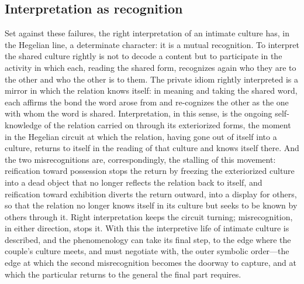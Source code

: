 \subsection*{Interpretation as recognition}

Set against these failures, the right interpretation of an intimate culture has, in the Hegelian line, a determinate character: it is a mutual recognition. To interpret the shared culture rightly is not to decode a content but to participate in the activity in which each, reading the shared form, recognizes again who they are to the other and who the other is to them. The private idiom rightly interpreted is a mirror in which the relation knows itself: in meaning and taking the shared word, each affirms the bond the word arose from and re-cognizes the other as the one with whom the word is shared. Interpretation, in this sense, is the ongoing self-knowledge of the relation carried on through its exteriorized forms, the moment in the Hegelian circuit at which the relation, having gone out of itself into a culture, returns to itself in the reading of that culture and knows itself there. And the two misrecognitions are, correspondingly, the stalling of this movement: reification toward possession stops the return by freezing the exteriorized culture into a dead object that no longer reflects the relation back to itself, and reification toward exhibition diverts the return outward, into a display for others, so that the relation no longer knows itself in its culture but seeks to be known by others through it. Right interpretation keeps the circuit turning; misrecognition, in either direction, stops it. With this the interpretive life of intimate culture is described, and the phenomenology can take its final step, to the edge where the couple's culture meets, and must negotiate with, the outer symbolic order---the edge at which the second misrecognition becomes the doorway to capture, and at which the particular returns to the general the final part requires.
